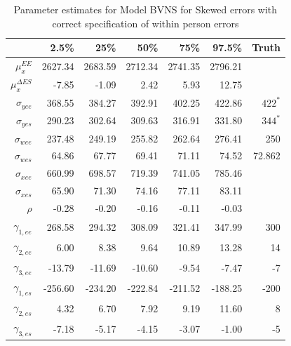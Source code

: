 \documentclass[11pt]{article}\usepackage[]{graphicx}\usepackage[]{color}
\begin{document}
\begin{table}[ht]
\centering
\begin{tabular}{rrrrrr|r}
  \hline
 & 2.5\% & 25\% & 50\% & 75\% & 97.5\% & Truth\\
  \hline
$\mu_x^{EE}$ & 2627.34 & 2683.59 & 2712.34 & 2741.35 & 2796.21 \\ 
  $\mu_x^{\Delta ES}$ & -7.85 & -1.09 & 2.42 & 5.93 & 12.75 \\ 
  $\sigma_{yee}$ & 368.55 & 384.27 & 392.91 & 402.25 & 422.86 & $422^*$ \\ 
  $\sigma_{yes}$ & 290.23 & 302.64 & 309.63 & 316.91 & 331.80 & $344^*$\\ 
  $\sigma_{wee}$ & 237.48 & 249.19 & 255.82 & 262.64 & 276.41 & 250 \\ 
  $\sigma_{wes}$ & 64.86 & 67.77 & 69.41 & 71.11 & 74.52 & 72.862\\ 
  $\sigma_{xee}$ & 660.99 & 698.57 & 719.39 & 741.05 & 785.46 \\ 
  $\sigma_{xes}$ & 65.90 & 71.30 & 74.16 & 77.11 & 83.11 \\ 
  $\rho$ & -0.28 & -0.20 & -0.16 & -0.11 & -0.03 \\ 
  $\gamma_{1,ee}$ & 268.58 & 294.32 & 308.09 & 321.41 & 347.99 & 300\\ 
  $\gamma_{2,ee}$ & 6.00 & 8.38 & 9.64 & 10.89 & 13.28 & 14 \\ 
  $\gamma_{3,ee}$ & -13.79 & -11.69 & -10.60 & -9.54 & -7.47 & -7 \\ 
  $\gamma_{1,es}$ & -256.60 & -234.20 & -222.84 & -211.52 & -188.25 & -200 \\ 
  $\gamma_{2,es}$ & 4.32 & 6.70 & 7.92 & 9.19 & 11.60 & 8 \\ 
  $\gamma_{3,es}$ & -7.18 & -5.17 & -4.15 & -3.07 & -1.00 & -5\\ 
   \hline
\end{tabular}
\caption{Parameter estimates for Model BVNS for Skewed errors with correct specification of within person errors}
\label{mbvnswpestimates}
\end{table}
\end{document}
